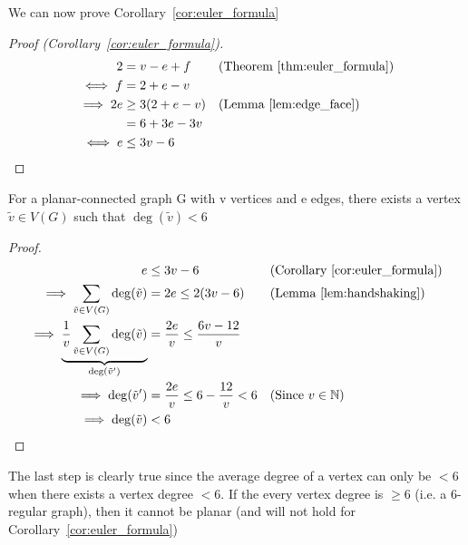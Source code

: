 We can now prove Corollary~\ref{cor:euler_formula}
\begin{proof}[Proof (Corollary~\ref{cor:euler_formula})]
\begin{align*}
2 &= v- e + f && (\text{Theorem}~\ref{thm:euler_formula}) \\
\iff f &= 2 + e - v \\
\implies 2e &\geq 3(2 + e - v) && (\text{Lemma}~\ref{lem:edge_face}) \\
&= 6 + 3e - 3v \\
\iff e &\leq 3v - 6
\end{align*}
\end{proof}

\begin{lemma}
\label{lem:deg_leq_six}
For a planar-connected graph G with v vertices and e edges, there exists a vertex $\tilde{v} \in V(G)$ such that $\deg(\tilde{v}) < 6$
\end{lemma}
\begin{proof}
\begin{align*}
e &\leq 3v - 6 && (\text{Corollary}~\ref{cor:euler_formula}) \\
\implies \sum_{\tilde{v} \in V(G)} \deg(\tilde{v}) &= 2e \leq 2(3v- 6) && (\text{Lemma}~\ref{lem:handshaking}) \\
\implies \underbrace{\frac{1}{v} \sum_{\tilde{v} \in V(G)} \deg(\tilde{v})}_{\deg(\tilde{v}')} &= \frac{2e}{v} \leq \frac{6v - 12}{v}\\
\implies \deg({\tilde{v}')} & = \frac{2e}{v} \leq 6 - \frac{12}{v} < 6 && (\text{Since} ~v \in \mathbb{N}) \\
\implies \deg(\tilde{v}) &< 6
\end{align*}
\end{proof}
The last step is clearly true since the average degree of a vertex can only be $< 6$ when there exists a vertex degree $< 6$. If the every vertex degree is $\geq 6$ (i.e. a 6-regular graph), then it cannot be planar (and will not hold for Corollary~\ref{cor:euler_formula})